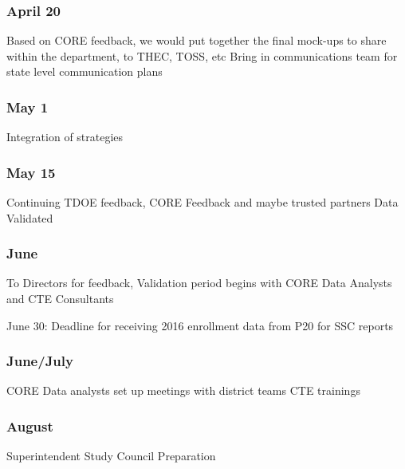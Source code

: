 \documentclass[11pt,]{article}
\begin{document}
\subsubsection{April 20}\label{april-20}

Based on CORE feedback, we would put together the final mock-ups to
share within the department, to THEC, TOSS, etc Bring in communications
team for state level communication plans

\subsubsection{May 1}\label{may-1}

Integration of strategies

\subsubsection{May 15}\label{may-15}

Continuing TDOE feedback, CORE Feedback and maybe trusted partners Data
Validated

\subsubsection{June}\label{june}

To Directors for feedback, Validation period begins with CORE Data
Analysts and CTE Consultants

June 30: Deadline for receiving 2016 enrollment data from P20 for SSC
reports

\subsubsection{June/July}\label{junejuly}

CORE Data analysts set up meetings with district teams CTE trainings

\subsubsection{August}\label{august}

Superintendent Study Council Preparation
\end{document}
